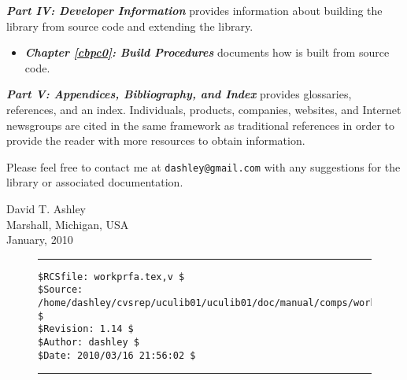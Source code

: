 \emph{\textbf{Part IV: Developer Information}} provides 
information about building the library from source code and
extending the library.

\begin{itemize}
\item \emph{\textbf{Chapter \ref{cbpc0}: \productbasenameshort{} Build Procedures}}
      documents how \emph{\productbasenameshort{}}
      is built from source code.
\end{itemize}

%

\emph{\textbf{Part V: Appendices, Bibliography, and Index}} provides
glossaries, references, and an index.
Individuals, products, companies, websites, and Internet newsgroups
are cited in the same framework
as traditional references in order to provide the reader with more
resources to obtain information.

Please feel free to contact me at \texttt{dashley@gmail.com} with
any suggestions for the \emph{\productbasenameshort{}}
library or associated documentation.

\vspace*{0.5in}

\noindent{}\hspace*{75mm}David T. Ashley                \\
           \hspace*{75mm}Marshall, Michigan, USA        \\
           \hspace*{75mm}January, 2010                  \\


\noindent\begin{figure}[!b]
\noindent\rule[-0.25in]{\textwidth}{1pt}
\begin{tiny}
\begin{verbatim}
$RCSfile: workprfa.tex,v $
$Source: /home/dashley/cvsrep/uculib01/uculib01/doc/manual/comps/workprfa.tex,v $
$Revision: 1.14 $
$Author: dashley $
$Date: 2010/03/16 21:56:02 $
\end{verbatim}
\end{tiny}
\noindent\rule[0.25in]{\textwidth}{1pt}
\end{figure}

